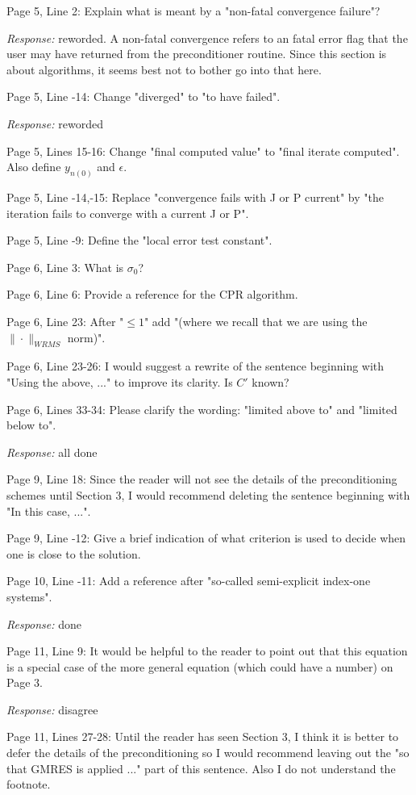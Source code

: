 Page 5, Line 2: Explain what is meant by a "non-fatal convergence failure"?

{\em Response:} reworded.  A non-fatal convergence refers to an fatal error flag that
the user may have returned from the preconditioner routine.  Since this section
is about algorithms, it seems best not to bother go into that here.

Page 5, Line -14: Change "diverged" to "to have failed".

{\em Response:} reworded

Page 5, Lines 15-16: Change "final computed value" to "final iterate
computed". Also define $y_{n(0)}$ and $\epsilon$.

Page 5, Line -14,-15: Replace "convergence fails with J or P current" by
"the iteration fails to converge with a current J or P".

Page 5, Line -9: Define the "local error test constant".

Page 6, Line 3: What is $\sigma_ 0$?  

Page 6, Line 6: Provide a reference for the CPR algorithm.

Page 6, Line 23: After "$ \leq 1$" add "(where we recall that we are
using the $\|\cdot\|_{WRMS}$ norm)".

Page 6, Line 23-26: I would suggest a rewrite of the sentence beginning 
with "Using the above, ..."  to improve its clarity. Is $C'$ known?

Page 6, Lines 33-34: Please clarify the wording: "limited above to" and
"limited below to".

{\em Response:} all done

Page 9, Line 18: Since the reader will not see the details of the
preconditioning schemes until Section 3, I would recommend deleting
the sentence beginning with "In this case, ...".

Page 9, Line -12: Give a brief indication of what criterion is used to
decide when one is close to the solution.

Page 10, Line -11: Add a reference after "so-called semi-explicit
index-one systems".

{\em Response:} done

Page 11, Line 9: It would be helpful to the reader to point out that
this equation is a special case of the more general equation (which
could have a number) on Page 3.

{\em Response:} disagree

Page 11, Lines 27-28: Until the reader has seen Section 3, I think it
is better to defer the details of the preconditioning so I would
recommend leaving out the "so that GMRES is applied ..."  part of this
sentence. Also I do not understand the footnote.

